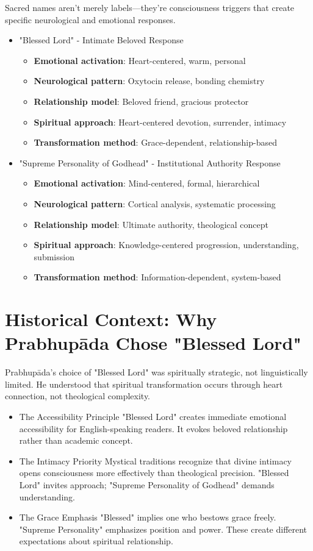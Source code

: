 \documentclass[11pt,twoside]{book}
\begin{document}
Sacred names aren't merely labels—they're consciousness triggers that create specific neurological and emotional responses.
\begin{itemize}
\item "Blessed Lord" - Intimate Beloved Response
\label{sec:org35ba129}
\begin{itemize}
\item \textbf{\textbf{Emotional activation}}: Heart-centered, warm, personal
\item \textbf{\textbf{Neurological pattern}}: Oxytocin release, bonding chemistry
\item \textbf{\textbf{Relationship model}}: Beloved friend, gracious protector
\item \textbf{\textbf{Spiritual approach}}: Heart-centered devotion, surrender, intimacy
\item \textbf{\textbf{Transformation method}}: Grace-dependent, relationship-based
\end{itemize}
\item "Supreme Personality of Godhead" - Institutional Authority Response
\label{sec:org99474a6}
\begin{itemize}
\item \textbf{\textbf{Emotional activation}}: Mind-centered, formal, hierarchical
\item \textbf{\textbf{Neurological pattern}}: Cortical analysis, systematic processing
\item \textbf{\textbf{Relationship model}}: Ultimate authority, theological concept
\item \textbf{\textbf{Spiritual approach}}: Knowledge-centered progression, understanding, submission
\item \textbf{\textbf{Transformation method}}: Information-dependent, system-based
\end{itemize}
\end{itemize}
\section*{Historical Context: Why Prabhupāda Chose "Blessed Lord"}
\label{sec:org57f7912}

Prabhupāda's choice of "Blessed Lord" was spiritually strategic, not linguistically limited. He understood that spiritual transformation occurs through heart connection, not theological complexity.
\begin{itemize}
\item The Accessibility Principle
\label{sec:orge9d5eec}
"Blessed Lord" creates immediate emotional accessibility for English-speaking readers. It evokes beloved relationship rather than academic concept.
\item The Intimacy Priority
\label{sec:orgfddad08}
Mystical traditions recognize that divine intimacy opens consciousness more effectively than theological precision. "Blessed Lord" invites approach; "Supreme Personality of Godhead" demands understanding.
\item The Grace Emphasis
\label{sec:org070ed36}
"Blessed" implies one who bestows grace freely. "Supreme Personality" emphasizes position and power. These create different expectations about spiritual relationship.
\end{itemize}
\end{document}
